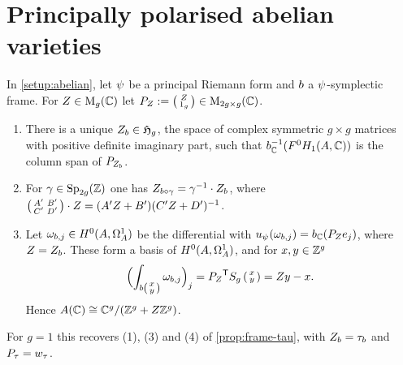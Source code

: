 \section{Principally polarised abelian varieties}

\begin{proposition}\label{prop:siegel-period-point}
In \cref{setup:abelian}, let $\psi_{}$ be a principal Riemann form
and $b$ a $\psi_{}$-symplectic frame. For $Z \in \mathrm{M}_{g}(\mathbb{C})$
let $P_{Z} := \left(\begin{smallmatrix} Z \\ 1_{g} \end{smallmatrix}\right) \in
\mathrm{M}_{2g\times g}(\mathbb{C})$.
\begin{enumerate}
\item There is a unique $Z_{b} \in \mathfrak{H}_{g}$, the space
  of complex symmetric $g\times g$ matrices with positive definite
  imaginary part, such that ${b}_{\mathbb{C}}^{-1}(F^{0}H_{1}(A,\mathbb{C}))$
  is the column span of $P_{Z_{b}}$.
\item For $\gamma \in \Sp{2g}{\ZZ}$ one has
  $Z_{b\circ\gamma} = \gamma^{-1}\cdot Z_{b}$,
  where $\left(\begin{smallmatrix} A' & B' \\ C' & D' \end{smallmatrix}\right)\cdot Z = (A'Z + B')(C'Z+D')^{-1}$.
\item Let $\omega_{b,j} \in H^{0}(A,\Omega^{1}_{A})$ be the
  differential with $u_{\psi_{}}(\omega_{b,j})
  = {b}_{\mathbb{C}}(P_{Z}e_{j})$, where
  $Z = Z_{b}$. These form a basis of $H^{0}(A,\Omega^{1}_{A})$, and
  for $x, y \in \mathbb{Z}^{g}$
  \[
    \Bigl(\int_{b\left(\begin{smallmatrix} x \\ y \end{smallmatrix}\right)}\omega_{b,j}\Bigr)_{j}
    = {P_{Z}}^{\mathsf{T}}S_{g}\left(\begin{smallmatrix} x \\ y \end{smallmatrix}\right) = Zy - x .
  \]
  Hence $A(\mathbb{C}) \cong \mathbb{C}^{g}/(\mathbb{Z}^{g} + Z\mathbb{Z}^{g})$.
\end{enumerate}
For $g = 1$ this recovers (1), (3) and (4) of \cref{prop:frame-tau}, with
$Z_{b} = \tau_{b}$ and $P_{\tau} =
w_{\tau}$.
\end{proposition}


